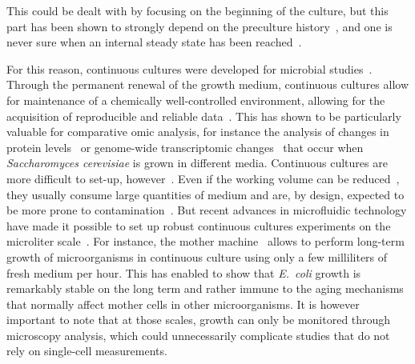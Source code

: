 This could be dealt with by focusing on the beginning of the culture, but this part has been shown to strongly depend on the preculture history~\cite{ng_damage_1962,dufrenne_effect_1997,shaw_effect_1967}, and one is never sure when an internal steady state has been reached~\cite{myers_culture_1944}.

For this reason, continuous cultures were developed for microbial studies~\cite{myers_culture_1944,novick_experiments_1950,herbert_continuous_1956}.
Through the permanent renewal of the growth medium, continuous cultures allow for maintenance of a chemically well-controlled environment, allowing for the acquisition of reproducible and reliable data~\cite{borirak_molecular_2014,hoskisson_continuous_2005}.
This has shown to be particularly valuable for comparative omic analysis, for instance the analysis of changes in protein levels~\cite{kolkman_comparative_2005} or genome-wide transcriptomic changes~\cite{boer_genome-wide_2003} that occur when \textit{Saccharomyces cerevisiae} is grown in different media.
Continuous cultures are more difficult to set-up, however~\cite{novick_experiments_1950,borirak_molecular_2014}.
Even if the working volume can be reduced~\cite{betts_miniature_2006}, they usually consume large quantities of medium and are, by design, expected to be more prone to contamination~\cite{novick_experiments_1950}.
But recent advances in microfluidic technology have made it possible to set up robust continuous cultures experiments on the microliter scale~\cite{wang_robust_2010,balaban_bacterial_2004}.
For instance, the mother machine~\cite{wang_robust_2010} allows to perform long-term growth of microorganisms
in continuous culture using only a few milliliters of fresh medium per hour.
This has enabled to show that \textit{E.~coli} growth is remarkably stable on the long term and rather immune to the aging mechanisms that normally affect mother cells in other microorganisms.
It is however important to note that at those scales, growth can only be monitored through microscopy analysis, which could unnecessarily complicate studies that do not rely on single-cell measurements.

